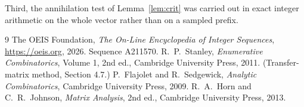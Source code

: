 \documentclass[11pt,a4paper]{article}
\theoremstyle{plain}
\theoremstyle{definition}
\begin{document}
Third, the annihilation test of Lemma~\ref{lem:crit} was carried out in exact integer
arithmetic on the whole vector rather than on a sampled prefix.

\begin{thebibliography}{9}
 The OEIS Foundation, \emph{The On-Line Encyclopedia of Integer
Sequences}, \url{https://oeis.org}, 2026. Sequence A211570.
 R.~P.~Stanley, \emph{Enumerative Combinatorics}, Volume 1, 2nd ed.,
Cambridge University Press, 2011. (Transfer-matrix method, Section 4.7.)
 P.~Flajolet and R.~Sedgewick, \emph{Analytic Combinatorics}, Cambridge
University Press, 2009.
 R.~A.~Horn and C.~R.~Johnson, \emph{Matrix Analysis}, 2nd ed., Cambridge
University Press, 2013.
\end{thebibliography}
\end{document}
